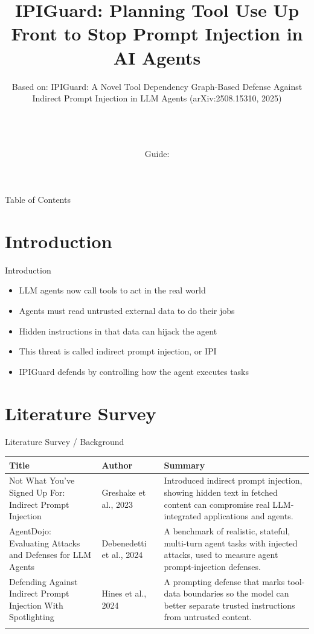 \documentclass[10pt]{beamer}
\title[B.Tech Seminar]{IPIGuard: Planning Tool Use Up Front to Stop Prompt Injection in AI Agents}
\subtitle{Based on: IPIGuard: A Novel Tool Dependency Graph-Based Defense Against Indirect Prompt Injection in LLM Agents (arXiv:2508.15310, 2025)}
\author[\studentname\ (\shortinst)]{\studentname \\ \small \rollno \\ \small \rollclass \\ \small Guide: \guidename}
\institute[]{\deptname \\ \collegename}
\date{\seminardate}
\begin{document}
\begin{frame}[plain]
  \titlepage
\end{frame}

\begin{frame}{Table of Contents}
  \tableofcontents
\end{frame}

\section{Introduction}
\begin{frame}{Introduction}
\begin{itemize}
  \item LLM agents now call tools to act in the real world
  \item Agents must read untrusted external data to do their jobs
  \item Hidden instructions in that data can hijack the agent
  \item This threat is called indirect prompt injection, or IPI
  \item IPIGuard defends by controlling how the agent executes tasks
\end{itemize}
\end{frame}

\section{Literature Survey}
\begin{frame}{Literature Survey / Background}
  \small
  \begin{tabular}{@{}p{2.7cm}p{2.3cm}p{5.6cm}@{}}
    \toprule
    \textbf{Title} & \textbf{Author} & \textbf{Summary} \\
    \midrule
    Not What You've Signed Up For: Indirect Prompt Injection & Greshake et al., 2023 & Introduced indirect prompt injection, showing hidden text in fetched content can compromise real LLM-integrated applications and agents. \\
    \addlinespace
    AgentDojo: Evaluating Attacks and Defenses for LLM Agents & Debenedetti et al., 2024 & A benchmark of realistic, stateful, multi-turn agent tasks with injected attacks, used to measure agent prompt-injection defenses. \\
    \addlinespace
    Defending Against Indirect Prompt Injection With Spotlighting & Hines et al., 2024 & A prompting defense that marks tool-data boundaries so the model can better separate trusted instructions from untrusted content. \\
    \addlinespace
    \bottomrule
  \end{tabular}
\end{frame}
\end{document}

